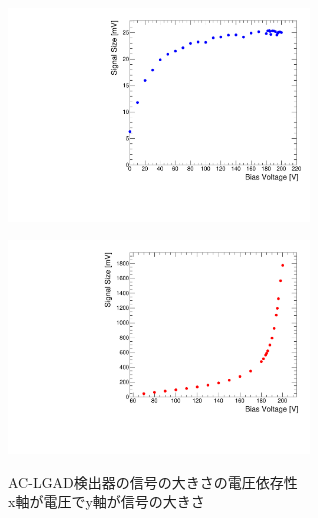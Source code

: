 \begin{figure}[h]
    \begin{minipage}[b]{0.5\linewidth}
        \centering
        \includegraphics[width=8cm]{fig/graph/PhvsVoltage_PIN.pdf}
        \label{fg:PIN_MPVvsBias}
    \end{minipage}
    \begin{minipage}[b]{0.5\linewidth}
        \centering
        \includegraphics[width=8cm]{fig/graph/PhvsVoltage_APD.pdf}
        \label{fg:APD_MPVvsBias}
    \end{minipage}
    \caption[AC-LGAD検出器の信号の大きさの電圧依存性]{AC-LGAD検出器の信号の大きさの電圧依存性\\x軸が電圧でy軸が信号の大きさ}
\end{figure}

